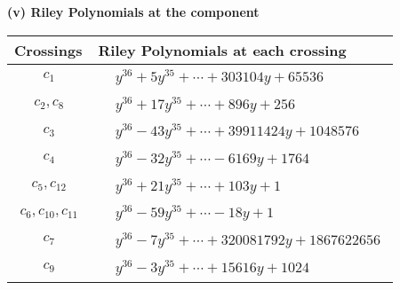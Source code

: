 \documentclass[1p]{elsarticle_modified}
\theoremstyle{definition}
\begin{document}
\newpage\renewcommand{\arraystretch}{1}
\flushleft \textbf{(v) Riley Polynomials at the component}\newline \\
\begin{tabular}{m{50pt}|m{274pt}}
Crossings & \hspace{64pt}Riley Polynomials at each crossing \\
\hline $$\begin{aligned}c_{1}\end{aligned}$$&$\begin{aligned}
&y^{36}+5 y^{35}+\cdots+303104 y+65536
\end{aligned}$\\
\hline $$\begin{aligned}c_{2},c_{8}\end{aligned}$$&$\begin{aligned}
&y^{36}+17 y^{35}+\cdots+896 y+256
\end{aligned}$\\
\hline $$\begin{aligned}c_{3}\end{aligned}$$&$\begin{aligned}
&y^{36}-43 y^{35}+\cdots+39911424 y+1048576
\end{aligned}$\\
\hline $$\begin{aligned}c_{4}\end{aligned}$$&$\begin{aligned}
&y^{36}-32 y^{35}+\cdots-6169 y+1764
\end{aligned}$\\
\hline $$\begin{aligned}c_{5},c_{12}\end{aligned}$$&$\begin{aligned}
&y^{36}+21 y^{35}+\cdots+103 y+1
\end{aligned}$\\
\hline $$\begin{aligned}c_{6},c_{10},c_{11}\end{aligned}$$&$\begin{aligned}
&y^{36}-59 y^{35}+\cdots-18 y+1
\end{aligned}$\\
\hline $$\begin{aligned}c_{7}\end{aligned}$$&$\begin{aligned}
&y^{36}-7 y^{35}+\cdots+320081792 y+1867622656
\end{aligned}$\\
\hline $$\begin{aligned}c_{9}\end{aligned}$$&$\begin{aligned}
&y^{36}-3 y^{35}+\cdots+15616 y+1024
\end{aligned}$\\
\hline
\end{tabular}\\~\\
\end{document}
